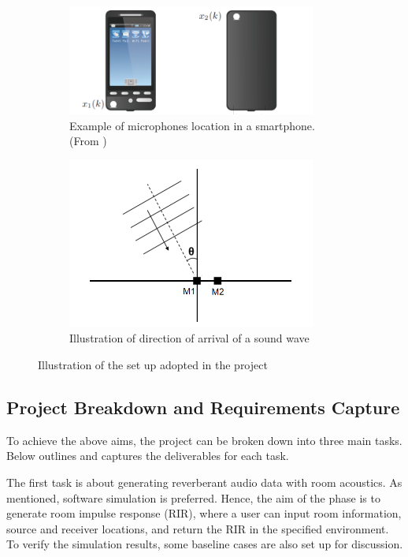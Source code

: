 \documentclass[a4paper,twoside,12pt,hidelinks]{article}
\begin{document}
\begin{figure}[H]
\centering
\begin{subfigure}[t]{0.49\textwidth}
\includegraphics[width=0.9\textwidth]{mobilephone}
\caption{Example of microphones location in a smartphone. (From \cite{Jeub2012NoiseDifferences})}
\label{fig:mobilephone}
\end{subfigure}
\begin{subfigure}[t]{0.49\textwidth}
\includegraphics[width=0.9\textwidth]{doa}
\caption{Illustration of direction of arrival of a sound wave}
\label{fig:doa}
\end{subfigure}
\caption{Illustration of the set up adopted in the project}
\end{figure}

\subsection{Project Breakdown and Requirements Capture}
To achieve the above aims, the project can be broken down into three main tasks. Below outlines and captures the deliverables for each task.

The first task is about generating reverberant audio data with room acoustics. As mentioned, software simulation is preferred. Hence, the aim of the phase is to generate room impulse response (RIR), where a user can input room information, source and receiver locations, and return the RIR in the specified environment. To verify the simulation results, some baseline cases are also set up for discussion.
\end{document}
